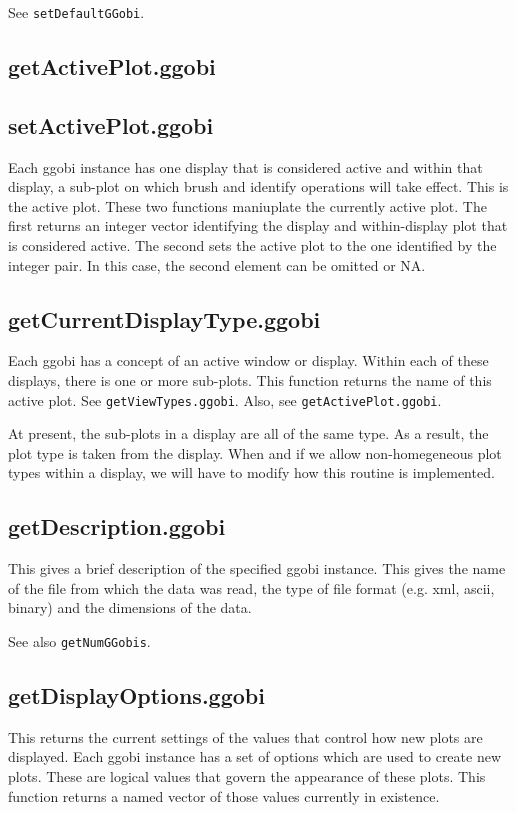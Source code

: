 \documentclass{article}
\def\SFunction#1{{\texttt{\red #1}}}
\begin{document}
See \SFunction{setDefaultGGobi}.


\subsection{getActivePlot.ggobi}
\subsection{setActivePlot.ggobi}
Each ggobi instance has one display that is considered active and
within that display, a sub-plot on which brush and identify operations
will take effect.  This is the active plot.  These two functions
maniuplate the currently active plot.  The first returns an integer
vector identifying the display and within-display plot that is
considered active.  The second sets the active plot to the one
identified by the integer pair.  In this case, the second element can
be omitted or NA.


\subsection{getCurrentDisplayType.ggobi}
Each ggobi has a concept of an active window or display. Within each
of these displays, there is one or more sub-plots.  This function
returns the name of this active plot.  See
\SFunction{getViewTypes.ggobi}.  Also, see
\SFunction{getActivePlot.ggobi}.

At present, the sub-plots in a display are all of the same type. As a
result, the plot type is taken from the display.  When and if we allow
non-homegeneous plot types within a display, we will have to modify
how this routine is implemented.

\subsection{getDescription.ggobi}
This gives a brief description of the specified ggobi instance.  This
gives the name of the file from which the data was read, the type of
file format (e.g. xml, ascii, binary) and the dimensions of the data.

See also \SFunction{getNumGGobis}.

\subsection{getDisplayOptions.ggobi}
This returns the current settings of the values that control how new
plots are displayed.  Each ggobi instance has a set of options which
are used to create new plots.  These are logical values that govern
the appearance of these plots.  This function returns a named vector
of those values currently in existence.
\end{document}
